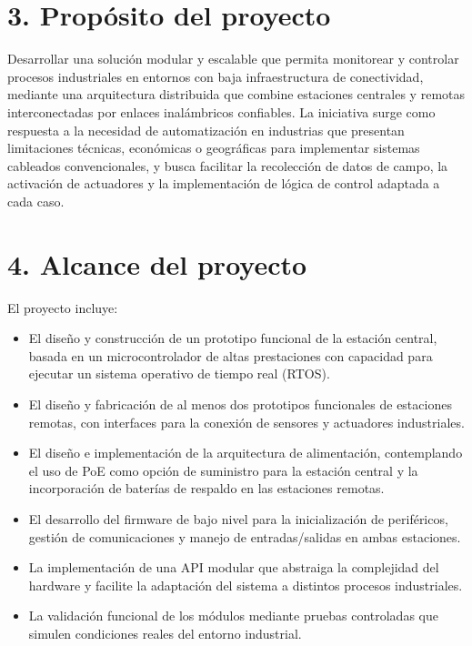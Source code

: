 \documentclass[
11pt, %
]{charter}
\begin{document}
\newpage
\section{3. Propósito del proyecto}
\label{sec:proposito}

Desarrollar una solución modular y escalable que permita monitorear y controlar procesos industriales en entornos con baja infraestructura de conectividad, mediante una arquitectura distribuida que combine estaciones centrales y remotas interconectadas por enlaces inalámbricos confiables. La iniciativa surge como respuesta a la necesidad de automatización en industrias que presentan limitaciones técnicas, económicas o geográficas para implementar sistemas cableados convencionales, y busca facilitar la recolección de datos de campo, la activación de actuadores y la implementación de lógica de control adaptada a cada caso. %

\section{4. Alcance del proyecto}
\label{sec:alcance}

El proyecto incluye:
\begin{itemize}
	\item El diseño y construcción de un prototipo funcional de la estación central, basada en un microcontrolador de altas prestaciones con capacidad para ejecutar un sistema operativo de tiempo real (RTOS).
	\item El diseño y fabricación de al menos dos prototipos funcionales de estaciones remotas, con interfaces para la conexión de sensores y actuadores industriales.
	\item El diseño e implementación de la arquitectura de alimentación, contemplando el uso de PoE como opción de suministro para la estación central y la incorporación de baterías de respaldo en las estaciones remotas.
	\item El desarrollo del firmware de bajo nivel para la inicialización de periféricos, gestión de comunicaciones y manejo de entradas/salidas en ambas estaciones.
	\item La implementación de una API modular que abstraiga la complejidad del hardware y facilite la adaptación del sistema a distintos procesos industriales.
	\item La validación funcional de los módulos mediante pruebas controladas que simulen condiciones reales del entorno industrial.
\end{itemize}
\end{document}

